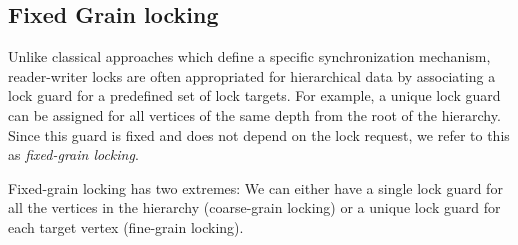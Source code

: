 \subsection{Fixed Grain locking}
Unlike classical approaches which define a specific synchronization mechanism, reader-writer locks are often appropriated for hierarchical data by associating a lock guard for a predefined set of lock targets. For example, a unique lock guard can be assigned for all vertices of the same depth from the root of the hierarchy. Since this guard is fixed and does not depend on the lock request, we refer to this as \emph{fixed-grain locking}.

Fixed-grain locking has two extremes: We can either have a single lock guard for all the vertices in the hierarchy (coarse-grain locking) or a unique lock guard for each target vertex (fine-grain locking).



